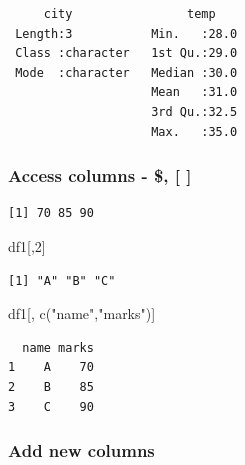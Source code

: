 \documentclass[
  letterpaper,
  DIV=11,
  numbers=noendperiod]{scrartcl}
\newenvironment{Shaded}{\begin{snugshade}}{\end{snugshade}}
\newcommand{\DecValTok}[1]{\textcolor[rgb]{0.68,0.00,0.00}{#1}}
\newcommand{\FunctionTok}[1]{\textcolor[rgb]{0.28,0.35,0.67}{#1}}
\newcommand{\NormalTok}[1]{\textcolor[rgb]{0.00,0.23,0.31}{#1}}
\newcommand{\OtherTok}[1]{\textcolor[rgb]{0.00,0.23,0.31}{#1}}
\newcommand{\SpecialCharTok}[1]{\textcolor[rgb]{0.37,0.37,0.37}{#1}}
\newcommand{\StringTok}[1]{\textcolor[rgb]{0.13,0.47,0.30}{#1}}
\begin{document}
\begin{verbatim}
     city                temp     
 Length:3           Min.   :28.0  
 Class :character   1st Qu.:29.0  
 Mode  :character   Median :30.0  
                    Mean   :31.0  
                    3rd Qu.:32.5  
                    Max.   :35.0  
\end{verbatim}

\subsubsection{Access columns - \$, {[} {]}}\label{access-columns--}

\begin{Shaded}
\end{Shaded}

\begin{verbatim}
[1] 70 85 90
\end{verbatim}

\begin{Shaded}
\begin{Highlighting}[]
\NormalTok{df1[,}\DecValTok{2}\NormalTok{]}
\end{Highlighting}
\end{Shaded}

\begin{verbatim}
[1] "A" "B" "C"
\end{verbatim}

\begin{Shaded}
\begin{Highlighting}[]
\NormalTok{df1[, }\FunctionTok{c}\NormalTok{(}\StringTok{"name"}\NormalTok{,}\StringTok{"marks"}\NormalTok{)]}
\end{Highlighting}
\end{Shaded}

\begin{verbatim}
  name marks
1    A    70
2    B    85
3    C    90
\end{verbatim}

\subsubsection{Add new columns}\label{add-new-columns}

\begin{Shaded}
\end{Shaded}
\end{document}
